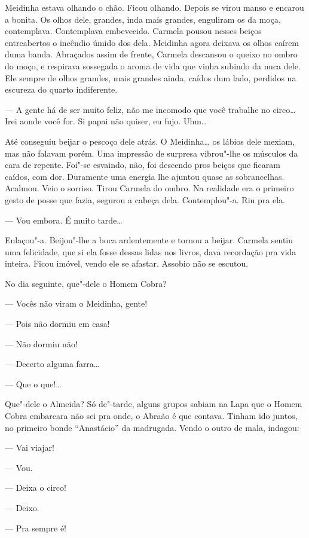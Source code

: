 Meidinha estava olhando o chão. Ficou olhando. Depois se virou manso e
encarou a bonita. Os olhos dele, grandes, inda mais grandes, enguliram
os da moça, contemplava. Contemplava embevecido. Carmela pousou nesses
beiços entreabertos o incêndio úmido dos dela. Meidinha agora deixava os
olhos caírem duma banda. Abraçados assim de frente, Carmela descansou o
queixo no ombro do moço, e respirava sossegada o aroma de vida que vinha
subindo da nuca dele. Ele sempre de olhos grandes, mais grandes ainda,
caídos dum lado, perdidos na escureza do quarto indiferente.

--- A gente há de ser muito feliz, não me incomodo que você trabalhe no
circo\ldots{} Irei aonde você for. Si papai não quiser, eu fujo. Uhm\ldots{}

Até conseguiu beijar o pescoço dele atrás. O Meidinha\ldots{} os lábios dele
mexiam, mas não falavam porém. Uma impressão de surpresa vibrou"-lhe os
músculos da cara de repente. Foi"-se esvaindo, não, foi descendo pros
beiços que ficaram caídos, com dor. Duramente uma energia lhe ajuntou
quase as sobrancelhas. Acalmou. Veio o sorriso. Tirou Carmela do ombro.
Na realidade era o primeiro gesto de posse que fazia, segurou a cabeça
dela. Contemplou"-a. Riu pra ela.

--- Vou embora. É muito tarde\ldots{}

Enlaçou"-a. Beijou"-lhe a boca ardentemente e tornou a beijar. Carmela
sentiu uma felicidade, que si ela fosse dessas lidas nos livros, dava
recordação pra vida inteira. Ficou imóvel, vendo ele se afastar. Assobio
não se escutou.

No dia seguinte, que"-dele o Homem Cobra?

--- Vocês não viram o Meidinha, gente!

--- Pois não dormiu em casa!

--- Não dormiu não!

--- Decerto alguma farra\ldots{}

--- Que o que!\ldots{}

Que"-dele o Almeida? Só de"-tarde, alguns grupos sabiam na Lapa que o
Homem Cobra embarcara não sei pra onde, o Abraão é que contava. Tinham
ido juntos, no primeiro bonde ``Anastácio'' da madrugada. Vendo o outro
de mala, indagou:

--- Vai viajar!

--- Vou.

--- Deixa o circo!

--- Deixo.

--- Pra sempre é!

